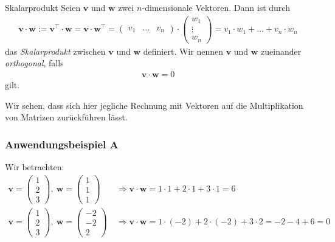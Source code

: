 \begin{mybox}{Skalarprodukt}
Seien $\textbf{v}$ und $\textbf{w}$ zwei $n$-dimensionale Vektoren.
Dann ist durch
\begin{align*}
\textbf{v} \cdot \textbf{w}
:=
\textbf{v}^\top \cdot \textbf{w} = \textbf{v} \cdot \textbf{w}^\top
=
\begin{pmatrix}
v_1 & \dots & v_n
\end{pmatrix}
\cdot 
\begin{pmatrix}
w_1\\
\vdots\\
w_n
\end{pmatrix}
= 
v_1 \cdot w_1 + \dots + v_n \cdot w_n
\end{align*}
das \textit{Skalarprodukt} zwischen $\textbf{v}$ und $\textbf{w}$ definiert.
Wir nennen $\textbf{v}$ und $\textbf{w}$ zueinander \textit{orthogonal}, falls
\begin{align*}
\textbf{v} \cdot \textbf{w} = 0 
\end{align*}
gilt. 
\end{mybox}
Wir sehen, dass sich hier jegliche Rechnung mit Vektoren auf die Multiplikation von Matrizen zurückführen lässt.
\subsubsection*{Anwendungsbeispiel A}
Wir betrachten:
\begin{align*}
\textbf{v}
= 
\begin{pmatrix}
1\\ 2 \\ 3
\end{pmatrix},
\
\textbf{w} 
=
\begin{pmatrix}
1\\ 1 \\ 1
\end{pmatrix}
\ 
&\Rightarrow
\textbf{v} \cdot \textbf{w} = 1 \cdot 1 + 2 \cdot 1 + 3 \cdot 1 = 6\\
\textbf{v}
= 
\begin{pmatrix}
1\\ 2 \\ 3
\end{pmatrix},
\
\textbf{w} 
=
\begin{pmatrix}
-2\\ -2 \\ 2
\end{pmatrix}
\ 
&\Rightarrow
\textbf{v} \cdot \textbf{w} = 1 \cdot (-2) + 2 \cdot (-2) + 3 \cdot 2 = -2 -4 + 6 = 0
\end{align*}

